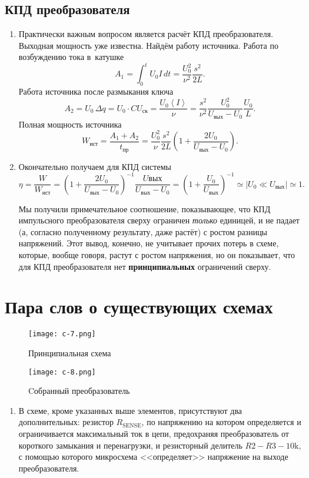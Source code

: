 \documentclass{letask}
\begin{document}
\subsection*{КПД преобразователя}
\begin{enumerate}
\item Практически важным вопросом является расчёт КПД преобразователя. Выходная мощность уже известна. Найдём работу источника.
Работа по возбуждению тока в~катушке
$$A_1 = \int_0^t U_0 I \,dt = \frac{U_0^2}{\nu^2} \frac{s^2}{2L}.$$
Работа источника после размыкания ключа
$$A_2 = U_0 \,\Delta q = U_0 \cdot C U_\text{ск} = \frac{U_0 \left< I \right>}{\nu} = \frac{s^2}{\nu^2} \frac{U_0^2}{U_\text{вых}-U_0} \frac{U_0}{L}.$$
Полная мощность источника
$$W_\text{ист} = \frac{A_1+A_2}{t_\text{пр}} = \frac{U_0^2}{\nu} \frac{s^2}{2L} \left( 1+ \frac{2U_0}{U_\text{вых} - U_0} \right).$$
\item Окончательно получаем для КПД системы
$$\eta = \frac{W}{W_\text{ист}} = \left( 1+\frac{2U_0}{U_\text{вых}-U_0} \right)^{-1} \frac{U\text{вых}}{U_\text{вых}-U_0} = \left( 1+\frac{U_0}{U_\text{вых}} \right)^{-1} \simeq \Big| U_0 \ll U_\text{вых} \Big| \simeq 1.$$

Мы получили примечательное соотношение, показывающее, что КПД импульсного преобразователя сверху ограничен \emph{только} единицей, и не падает (а, согласно полученному результату, даже растёт) с ростом разницы напряжений. Этот вывод, конечно, не учитывает прочих потерь в схеме, которые, вообще говоря, растут с ростом напряжения, но он показывает, что для КПД преобразователя нет \textbf{принципиальных} ограничений сверху.
\end{enumerate}


\section*{Пара слов о существующих схемах}

\begin{figure}[H]
\begin{minipage}[h]{0.49\linewidth}
\centering
\texttt{[image: c-7.png]}
\caption{Принципиальная схема}
\end{minipage}
\hfill
\begin{minipage}[h]{0.49\linewidth}
\centering
\texttt{[image: c-8.png]}
\caption{Cобранный преобразователь}
\end{minipage}
\end{figure}

\begin{enumerate}
\item В схеме, кроме указанных выше элементов, присутствуют два дополнительных: резистор $R_\text{SENSE}$, по напряжению на котором определяется и ограничивается максимальный ток в цепи, предохраняя преобразователь от короткого замыкания и перенагрузки, и резисторный делитель $R2-R3-10\mathrm{k}$, с помощью которого микросхема <<определяет>> напряжение на выходе преобразователя.
\end{enumerate}
\end{document}
